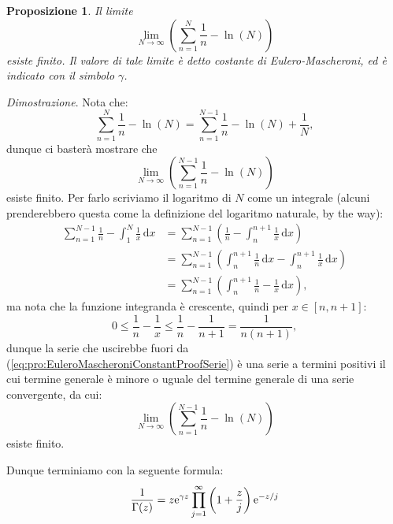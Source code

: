 \documentclass[11pt]{book}
\makeatletter
\theoremstyle{Definizione}
\theoremstyle{TeoremaProposizioneLemmaCorollarioCongettura}
\newtheorem{mypropo}[myteo]{Proposizione}
\theoremstyle{OsservazioneNotaEsempio}
\renewenvironment{proof}[1][\proofname]{\par
  \normalfont \topsep6\p@\@plus6\p@\relax
  \trivlist
  \item[\hskip\labelsep
        \itshape
    #1\@addpunct{.}]\ignorespaces
}{%
  \endtrivlist\@endpefalse
}
\renewenvironment{proof}{\textsl{Dimostrazione}.}{}
\newcommand{\e}{\textup{e}}
\renewcommand{\d}{\mathrm{d}}
\newcommand{\dx}{\,\d x}
\makeatother
\begin{document}
\begin{boxpro}
\begin{mypropo}
Il limite
$$
\lim_{N \to \infty} \left(\sum_{n = 1}^N \frac{1}{n}-\ln(N)\right)
$$
esiste finito. Il valore di tale limite è detto costante di Eulero-Mascheroni, ed è indicato con il simbolo $\gamma$.
\end{mypropo}
\tcblower
\begin{proof}
Nota che:
$$
\sum_{n = 1}^N \frac{1}{n}-\ln(N) = \sum_{n = 1}^{N-1} \frac{1}{n}-\ln(N)+\frac{1}{N},
$$
dunque ci basterà mostrare che
$$
\lim_{N \to \infty} \left(\sum_{n = 1}^{N-1} \frac{1}{n}-\ln(N)\right)
$$
esiste finito. Per farlo scriviamo il logaritmo di $N$ come un integrale (alcuni prenderebbero questa come la definizione del logaritmo naturale, by the way):
\begin{align}\label{eq:pro:EuleroMascheroniConstantProofSerie}
\sum_{n = 1}^{N-1} \frac{1}{n}-\int_1^{N} \frac{1}{x}\dx &= \sum_{n = 1}^{N-1} \left(\frac{1}{n}-\int_{n}^{n+1} \frac{1}{x}\dx\right)\nonumber\\
&= \sum_{n = 1}^{N-1}\left(\int_{n}^{n+1} \frac{1}{n}\dx-\int_{n}^{n+1}\frac{1}{x}\dx\right)\nonumber\\
&= \sum_{n = 1}^{N-1} \left(\int_{n}^{n+1}\frac{1}{n}-\frac{1}{x}\dx\right),
\end{align}
ma nota che la funzione integranda è crescente, quindi per $x\in [n,n+1]$:
$$
0 \leq \frac{1}{n}-\frac{1}{x}\leq \frac{1}{n}-\frac{1}{n+1} = \frac{1}{n(n+1)},
$$
dunque la serie che uscirebbe fuori da (\ref{eq:pro:EuleroMascheroniConstantProofSerie}) è una serie a termini positivi il cui termine generale è minore o uguale del termine generale di una serie convergente, da cui:
$$
\lim_{N \to \infty} \left(\sum_{n = 1}^{N-1} \frac{1}{n}-\ln(N)\right)
$$
esiste finito.
\end{proof}
\end{boxpro}
\noindent
Dunque terminiamo con la seguente formula:
$$
\frac{1}{\Gamma(z)} = z\e^{\gamma z} \prod_{j = 1}^\infty \left(1+\frac{z}{j}\right)\e^{-z/j}
$$
\end{document}
